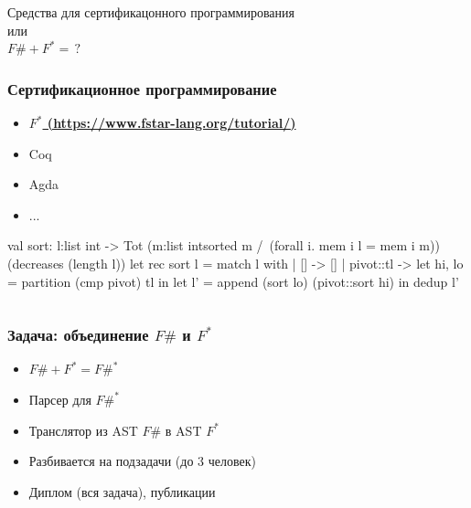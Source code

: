 \documentclass{beamer}
\begin{document}
\begin{frame}[plain,c]
 \transwipe[direction=90]
 \begin{center}
  \Huge Средства для сертификацонного программирования \\ или \\ $F\# + F^* = \, ?$
 \end{center}
\end{frame}

\begin{frame}[fragile]
  \transwipe[direction=90]
  \frametitle{Сертификационное программирование}
  \begin{itemize}
    \item \underline{\bfseries{$F^*$} (\url{https://www.fstar-lang.org/tutorial/})}
    \item Coq
    \item Agda
    \item ...
  \end{itemize}

\begin{pyglist}[language=ocaml]
val sort: l:list int -> 
          Tot (m:list int{sorted m 
                          /\ (forall i. mem i l = mem i m)})
          (decreases (length l))
let rec sort l = match l with
  | [] -> []
  | pivot::tl ->
    let hi, lo = partition (cmp pivot) tl in
    let l' = append (sort lo) (pivot::sort hi) in
    dedup l' 
\end{pyglist}

\begin{verbatim}
\end{verbatim}

\end{frame}


\begin{frame}
  \transwipe[direction=90]
  \frametitle{Задача: объединение $F\#$ и $F^*$}
  \begin{itemize}
    \item $F\# + F^* = F\#^*$
    \item Парсер для $F\#^*$
    \item Транслятор из AST $F\#$ в AST $F^*$
    \item Разбивается на подзадачи (до 3 человек)
    \item Диплом (вся задача), публикации
  \end{itemize}
\end{frame}
\end{document}
